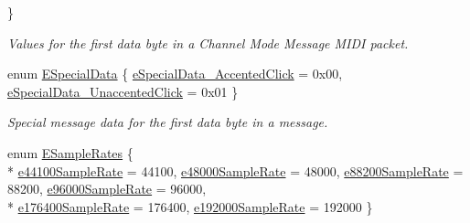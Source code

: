 \begin{DoxyCompactItemize}
 \}
\begin{DoxyCompactList}\small\item\em Values for the first data byte in a Channel Mode Message M\+I\+D\+I packet. \end{DoxyCompactList}\item 
enum \hyperlink{a00288_a6884ba464f3e76eb758d45daf1395199}{E\+Special\+Data} \{ \hyperlink{a00288_a6884ba464f3e76eb758d45daf1395199a52061b5587075953631c1389016cb0cf}{e\+Special\+Data\+\_\+\+Accented\+Click} = 0x00, 
\hyperlink{a00288_a6884ba464f3e76eb758d45daf1395199a35a276fca410721fc1c39adb01be7af3}{e\+Special\+Data\+\_\+\+Unaccented\+Click} = 0x01
 \}
\begin{DoxyCompactList}\small\item\em Special message data for the first data byte in a message. \end{DoxyCompactList}\item 
enum \hyperlink{a00288_a60daf5874c02a01d2af8c582c0643e2d}{E\+Sample\+Rates} \{ \\*
\hyperlink{a00288_a60daf5874c02a01d2af8c582c0643e2da0fabb364c77d1597745ea7faede310a9}{e44100\+Sample\+Rate} = 44100, 
\hyperlink{a00288_a60daf5874c02a01d2af8c582c0643e2dabf618a3399a754a6ec3a367c102f8850}{e48000\+Sample\+Rate} = 48000, 
\hyperlink{a00288_a60daf5874c02a01d2af8c582c0643e2da6b2f92d94b3c151993d544d924321620}{e88200\+Sample\+Rate} = 88200, 
\hyperlink{a00288_a60daf5874c02a01d2af8c582c0643e2da1161e560e2b301b8b45d17083696915e}{e96000\+Sample\+Rate} = 96000, 
\\*
\hyperlink{a00288_a60daf5874c02a01d2af8c582c0643e2da17be0028e4f2ca09f095573240cef263}{e176400\+Sample\+Rate} = 176400, 
\hyperlink{a00288_a60daf5874c02a01d2af8c582c0643e2da755a96e92d23adf2ad3546551e2ad49c}{e192000\+Sample\+Rate} = 192000
 \}
\end{DoxyCompactItemize}
